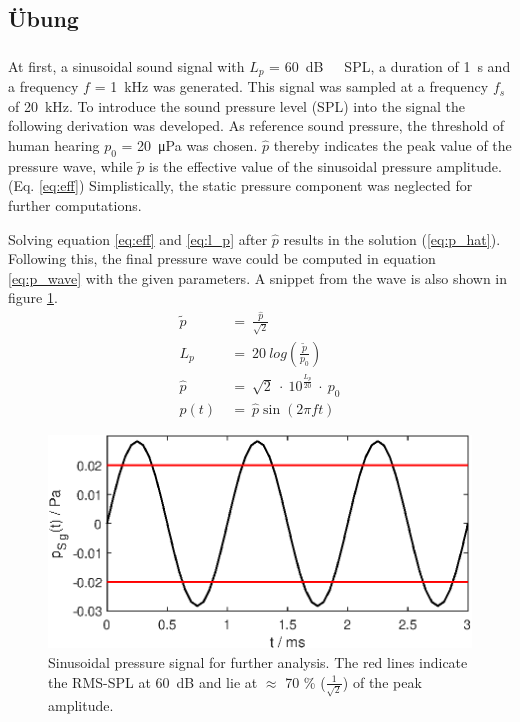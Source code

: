 \subsection{Übung}
\subsubsection{}

At first, a sinusoidal sound signal with $L_p$ = \SI{60}{dB\ SPL}, a duration of \SI{1}{\s} and a frequency $f$ = \SI{1}{\kilo\Hz} was generated. This signal was sampled at a frequency $f_s$ of \SI{20}{\kilo\Hz}. To introduce the sound pressure level (SPL) into the signal the following derivation was developed. As reference sound pressure, the threshold of human hearing $p_0$ = \SI{20}{\micro\pascal} was chosen. $\hat{p}$ thereby indicates the peak value of the pressure wave, while $\tilde{p}$ is the effective value of the sinusoidal pressure amplitude.(Eq. \ref{eq:eff}) Simplistically, the static pressure component was neglected for further computations.

Solving equation \ref{eq:eff} and \ref{eq:l_p} after $\hat{p}$ results in the solution (\ref{eq:p_hat}). Following this, the final pressure wave could be computed in equation \ref{eq:p_wave} with the given parameters. A snippet from the wave is also shown in figure \ref{fig:signal}.
\begin{align}
    \tilde{p}\ &=\ \frac{\hat{p}}{\sqrt{2}} \label{eq:eff}\\
    L_p\ &=\ 20\ log\left(\frac{\tilde{p}}{p_0} \right) \label{eq:l_p}\\
    \hat{p}\ &=\ \sqrt{2}\ \cdot\ 10^{\frac{L_p}{20}}\ \cdot\ p_0 \label{eq:p_hat}\\
    p(t)\ &=\ \hat{p} \sin(2\pi f t) \label{eq:p_wave}
\end{align}
\begin{figure}[h] 
  \centering
  \includegraphics[width=.9\linewidth]{ue2/sig.eps} %
  \caption{Sinusoidal pressure signal for further analysis. The red lines indicate the RMS-SPL at \SI{60}{dB} and lie at $\approx$ 70 \% ($\frac{1}{\sqrt{2}}$) of the peak amplitude.}
  \label{fig:signal}
\end{figure}

